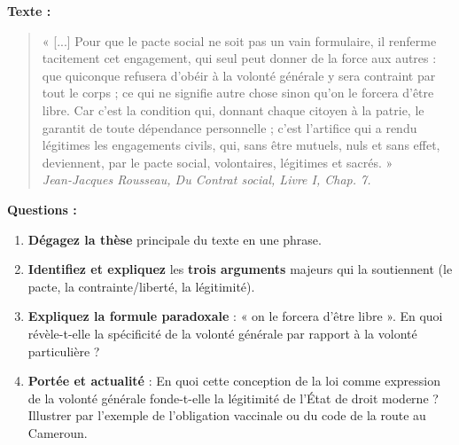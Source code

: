 \documentclass[11pt]{article}
\newcommand{\cle}[1]{{\popxbold\color{popdark}#1}}
\begin{document}
\begin{exercice}
\textbf{Texte :}
\begin{quote}
« [...] Pour que le pacte social ne soit pas un vain formulaire, il renferme tacitement cet engagement, qui seul peut donner de la force aux autres : que quiconque refusera d'obéir à la volonté générale y sera contraint par tout le corps ; ce qui ne signifie autre chose sinon qu'on le forcera d'être libre. Car c'est la condition qui, donnant chaque citoyen à la patrie, le garantit de toute dépendance personnelle ; c'est l'artifice qui a rendu légitimes les engagements civils, qui, sans être mutuels, nuls et sans effet, deviennent, par le pacte social, volontaires, légitimes et sacrés. » \\
\emph{Jean-Jacques Rousseau, \textit{Du Contrat social}, Livre I, Chap. 7.}
\end{quote}
\textbf{Questions :}
\begin{enumerate}
    \item \textbf{Dégagez la thèse} principale du texte en une phrase.
    \item \textbf{Identifiez et expliquez} les \textbf{trois arguments} majeurs qui la soutiennent (le pacte, la contrainte/liberté, la légitimité).
    \item \textbf{Expliquez la formule paradoxale} : « on le forcera d'être libre ». En quoi révèle-t-elle la spécificité de la \cle{volonté générale} par rapport à la volonté particulière ?
    \item \textbf{Portée et actualité} : En quoi cette conception de la loi comme expression de la volonté générale fonde-t-elle la \cle{légitimité} de l'État de droit moderne ? Illustrer par l'exemple de l'obligation vaccinale ou du code de la route au Cameroun.
\end{enumerate}
\end{exercice}
\end{document}
